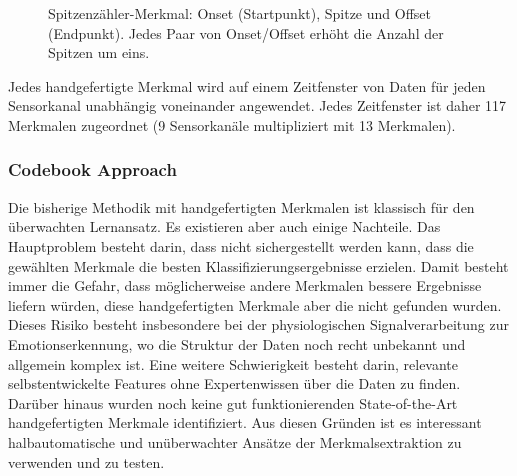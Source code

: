 \begin{figure}[h] 
\caption[Spitzenzähler-Merkmal]{Spitzenzähler-Merkmal: Onset (Startpunkt), Spitze und Offset (Endpunkt). Jedes Paar von Onset/Offset erhöht die Anzahl der Spitzen um eins.} 
\label{fig:peaks} \end{figure} \vspace{0.5cm}


Jedes handgefertigte Merkmal wird auf einem Zeitfenster von Daten für jeden Sensorkanal unabhängig voneinander angewendet. 
Jedes Zeitfenster ist daher 117 Merkmalen zugeordnet (9 Sensorkanäle multipliziert mit 13 Merkmalen). \\





\subsubsection{Codebook Approach} \label{ca-1}


Die bisherige Methodik mit handgefertigten Merkmalen ist klassisch für den überwachten Lernansatz. 
Es existieren aber auch einige Nachteile. 
Das Hauptproblem besteht darin, dass nicht sichergestellt werden kann, dass die gewählten Merkmale die besten Klassifizierungsergebnisse erzielen. Damit besteht immer die Gefahr, dass möglicherweise andere Merkmalen bessere Ergebnisse liefern würden, diese handgefertigten Merkmale aber die  nicht gefunden wurden. Dieses Risiko besteht insbesondere bei der physiologischen Signalverarbeitung zur Emotionserkennung, wo die Struktur der Daten noch recht unbekannt und allgemein komplex ist. 
Eine weitere Schwierigkeit besteht darin, relevante selbstentwickelte Features ohne Expertenwissen über die Daten zu finden.
Darüber hinaus wurden noch keine gut funktionierenden State-of-the-Art handgefertigten Merkmale identifiziert.
Aus diesen Gründen ist es interessant halbautomatische und unüberwachter Ansätze der Merkmalsextraktion zu verwenden und zu testen. \\


